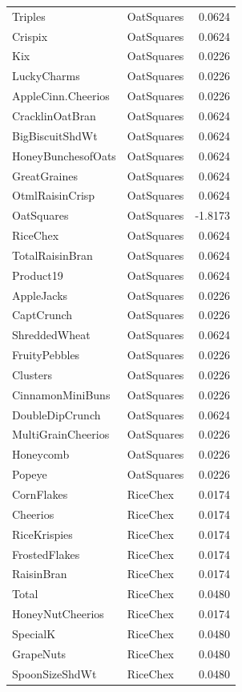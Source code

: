 \begin{longtable}{llr}
Triples & OatSquares & 0.0624 \\
Crispix & OatSquares & 0.0624 \\
Kix & OatSquares & 0.0226 \\
LuckyCharms & OatSquares & 0.0226 \\
AppleCinn.Cheerios & OatSquares & 0.0226 \\
CracklinOatBran & OatSquares & 0.0624 \\
BigBiscuitShdWt & OatSquares & 0.0624 \\
HoneyBunchesofOats & OatSquares & 0.0624 \\
GreatGraines & OatSquares & 0.0624 \\
OtmlRaisinCrisp & OatSquares & 0.0624 \\
OatSquares & OatSquares & -1.8173 \\
RiceChex & OatSquares & 0.0624 \\
TotalRaisinBran & OatSquares & 0.0624 \\
Product19 & OatSquares & 0.0624 \\
AppleJacks & OatSquares & 0.0226 \\
CaptCrunch & OatSquares & 0.0226 \\
ShreddedWheat & OatSquares & 0.0624 \\
FruityPebbles & OatSquares & 0.0226 \\
Clusters & OatSquares & 0.0226 \\
CinnamonMiniBuns & OatSquares & 0.0226 \\
DoubleDipCrunch & OatSquares & 0.0624 \\
MultiGrainCheerios & OatSquares & 0.0226 \\
Honeycomb & OatSquares & 0.0226 \\
Popeye & OatSquares & 0.0226 \\
CornFlakes & RiceChex & 0.0174 \\
Cheerios & RiceChex & 0.0174 \\
RiceKrispies & RiceChex & 0.0174 \\
FrostedFlakes & RiceChex & 0.0174 \\
RaisinBran & RiceChex & 0.0174 \\
Total & RiceChex & 0.0480 \\
HoneyNutCheerios & RiceChex & 0.0174 \\
SpecialK & RiceChex & 0.0480 \\
GrapeNuts & RiceChex & 0.0480 \\
SpoonSizeShdWt & RiceChex & 0.0480 \\

\end{longtable}
